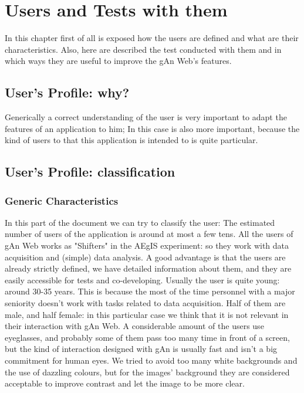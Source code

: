 
\chapter{Users and Tests with them} %

\label{Chapter8} %

In this chapter first of all is exposed how the users are defined and what are their characteristics. Also, here are described the test conducted with them and in which ways they are useful to improve the gAn Web's features.   

\section{User's Profile: why?}

Generically a correct understanding of the user is very important to adapt the features of an application to him; In this case is also more important, because the kind of users to that this application is intended to is quite particular.


\section{User's Profile: classification}

\subsection{Generic Characteristics}
In this part of the document we can try to classify the user:
The estimated number of users of the application is around at most a few tens.
All the users of gAn Web works as "Shifters" in the AEgIS experiment: so they work with data acquisition and (simple) data analysis.
A good advantage is that the users are already strictly defined, we have detailed information about them, and they are easily accessible for tests and co-developing.
Usually the user is quite young: around 30-35 years. This is because the most of the time personnel with a major seniority doesn't work with tasks related to data acquisition. 
Half of them are male, and half female: in this particular case we think that it is not relevant in their interaction with gAn Web.
A considerable amount of the users use eyeglasses, and probably some of them pass too many time in front of a screen, but the kind of interaction designed with gAn is usually fast and isn't a big commitment for human eyes. We tried to avoid too many white backgrounds and the use of dazzling colours, but for the images' background they are considered acceptable to improve contrast and let the image to be more clear.  

